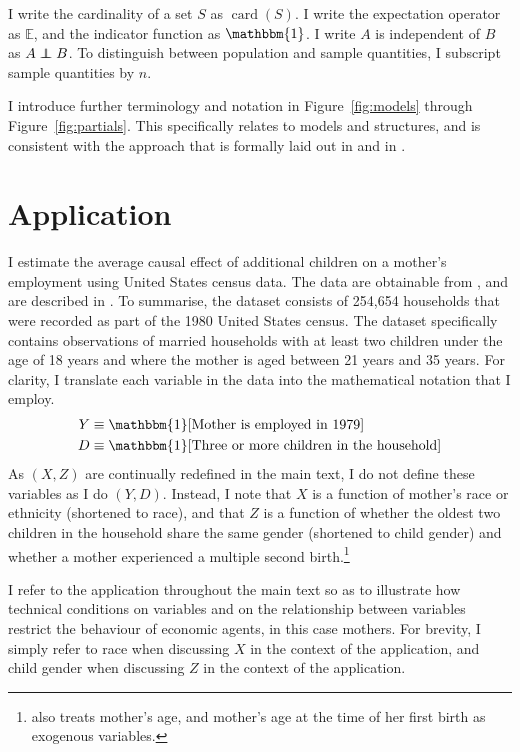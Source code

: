 \documentclass[12pt,a4paper,twoside]{article}
\newcommand\independent{\protect\mathpalette{\protect\independenT}{\perp}}
\def\independenT#1#2{\mathrel{\rlap{$#1#2$}\mkern2mu{#1#2}}}
\DeclareMathOperator*{\card}{card}
\newcommand{\US}{United States}
\numberwithin{equation}{section}
\begin{document}
I write the cardinality of a set $S$ as $\card (S)$. I write the expectation operator as $\mathbb{E}$, and the indicator function as $\mathbbm{1}$. I write $A$ is independent of $B$ as $A\independent B$. To distinguish between population and sample quantities, I subscript sample quantities by $n$. 

I introduce further terminology and notation in Figure~\ref{fig:models} through Figure~\ref{fig:partials}. This specifically relates to models and structures, and is consistent with the approach that is formally laid out in \cite{h50} and in \cite{krE50}. 
\section*{Application}
I estimate the average causal effect of additional children on a mother's employment using {\US} census data. The data are obtainable from \cite{Angristdatabank}, and are described in \cite{ae98}. To summarise, the dataset consists of 254,654 households that were recorded as part of the 1980 {\US} census. The dataset specifically contains observations of married households with at least two children under the age of 18 years and where the mother is aged between 21 years and 35 years. For clarity, I translate each variable in the data into the mathematical notation that I employ.
\begin{align*}
Y&\equiv\mathbbm{1}[\text{Mother is employed in 1979}]\\
D&\equiv\mathbbm{1}[\text{Three or more children in the household}]
\end{align*}
As $(X,Z)$ are continually redefined in the main text, I do not define these variables as I do $(Y,D)$. Instead, I note that $X$ is a function of mother's race or ethnicity (shortened to race), and that $Z$ is a function of whether the oldest two children in the household share the same gender (shortened to child gender) and whether a mother experienced a multiple second birth.\footnote{\cite{ae98} also treats mother's age, and mother's age at the time of her first birth as exogenous variables.}

I refer to the application throughout the main text so as to illustrate how technical conditions on variables and on the relationship between variables restrict the behaviour of economic agents, in this case mothers. For brevity, I simply refer to race when discussing $X$ in the context of the application, and child gender when discussing $Z$ in the context of the application.
\end{document}
